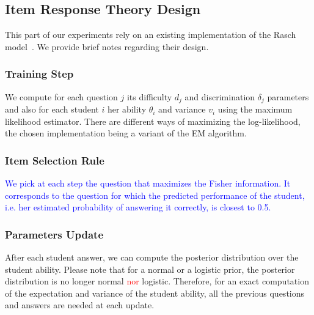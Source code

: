 \documentclass{sig-alternate}
\newcommand\alert[1]{\textcolor{red}{#1}}
\newcommand\note[1]{\textcolor{blue}{#1}}
\begin{document}

\subsection{Item Response Theory Design}

This part of our experiments rely on an existing implementation of the Rasch model~\cite{MagisRaiche2012,Rizopoulos2006}. We provide brief notes regarding their design.

\subsubsection{Training Step}

We compute for each question $j$ its difficulty $d_j$ and discrimination $\delta_j$ parameters and also for each student $i$ her ability $\theta_i$ and variance $v_i$ using the maximum likelihood estimator. There are different ways of maximizing the log-likelihood, the chosen implementation being a variant of the EM algorithm. %

\subsubsection{Item Selection Rule}

\note{We pick at each step the question that maximizes the Fisher information. It corresponds to the question for which the predicted performance of the student, i.e. her estimated probability of answering it correctly, is closest to 0.5.} %

\subsubsection{Parameters Update}

After each student answer, we can compute the posterior distribution over the student ability. Please note that for a normal or a logistic prior, the posterior distribution is no longer normal \alert{nor} logistic. Therefore, for an exact computation of the expectation and variance of the student ability, all the previous questions and answers are needed at each update.
\end{document}
